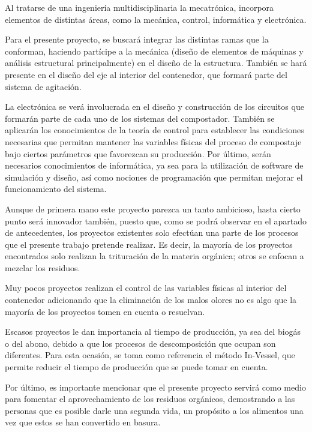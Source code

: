 Al tratarse de una ingeniería multidisciplinaria la mecatrónica, incorpora elementos de distintas áreas, como la mecánica, control, informática y electrónica.

Para el presente proyecto, se buscará integrar las distintas ramas que la conforman, haciendo partícipe a la mecánica (diseño de elementos de máquinas y análisis estructural principalmente) en el diseño de la estructura. También se hará presente en el diseño del eje al interior del contenedor, que formará parte del sistema de agitación.

La electrónica se verá involucrada en el diseño y construcción de los circuitos que formarán parte de cada uno de los sistemas del compostador. También se aplicarán los conocimientos de la teoría de control para establecer las condiciones necesarias que permitan mantener las variables físicas del proceso de compostaje bajo ciertos parámetros que favorezcan su producción. Por último, serán necesarios conocimientos de informática, ya sea para la utilización de software de simulación y diseño, así como nociones de programación que permitan mejorar el funcionamiento del sistema.

Aunque de primera mano este proyecto parezca un tanto ambicioso, hasta cierto punto será innovador también, puesto que, como se podrá observar en el apartado de antecedentes, los proyectos existentes solo efectúan una parte de los procesos que el presente trabajo pretende realizar. Es decir, la mayoría de los proyectos encontrados solo realizan la trituración de la materia orgánica; otros se enfocan a mezclar los residuos. 

Muy pocos proyectos realizan el control de las variables físicas al interior del contenedor adicionando que la eliminación de los malos olores no es algo que la mayoría de los proyectos tomen en cuenta o resuelvan.

Escasos proyectos le dan importancia al tiempo de producción, ya sea del biogás o del abono, debido a que los procesos de descomposición que ocupan son diferentes. Para esta ocasión, se toma como referencia el método In-Vessel, que permite reducir el tiempo de producción que se puede tomar en cuenta.

Por último, es importante mencionar que el presente proyecto servirá como medio para fomentar el aprovechamiento de los residuos orgánicos, demostrando a las personas que es posible darle una segunda vida, un propósito a los alimentos una vez que estos se han convertido en basura.

